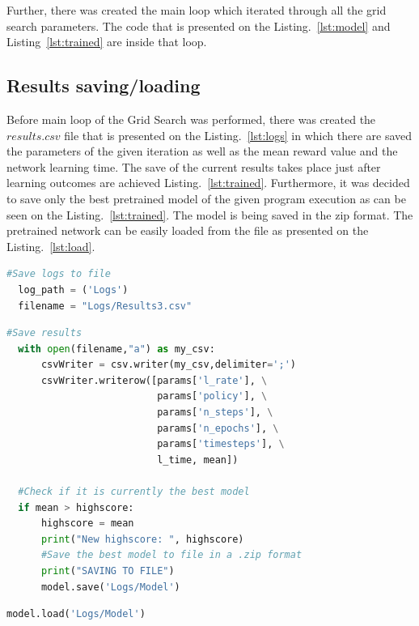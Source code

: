 \documentclass[runningheads]{llncs}
\begin{document}
Further, there was created the main loop which iterated through all the grid search parameters. The code that is presented on the Listing.~\ref{lst:model} and Listing~\ref{lst:trained} are inside that loop.

\subsection{Results saving/loading}
Before main loop of the Grid Search was performed, there was created the $results.csv$ file that is presented on the Listing.~\ref{lst:logs} in which there are saved the parameters of the given iteration as well as the mean reward value and the network learning time. The save of the current results takes place just after learning outcomes are achieved Listing.~\ref{lst:trained}. Furthermore, it was decided to save only the best pretrained model of the given program execution as can be seen on the Listing.~\ref{lst:trained}. The model is being saved in the zip format. The pretrained network can be easily loaded from the file as presented on the Listing.~\ref{lst:load}.

\begin{lstlisting}[caption={Log files creation}, language=Python, label={lst:logs}]
  #Save logs to file
  log_path = ('Logs')
  filename = "Logs/Results3.csv"
\end{lstlisting}

\begin{lstlisting}[caption={Pretrained model and parameters saving}, language=Python, label={lst:trained}]
  #Save results
  with open(filename,"a") as my_csv:
      csvWriter = csv.writer(my_csv,delimiter=';')
      csvWriter.writerow([params['l_rate'], \
                          params['policy'], \
                          params['n_steps'], \
                          params['n_epochs'], \
                          params['timesteps'], \
                          l_time, mean])
  
  #Check if it is currently the best model
  if mean > highscore:
      highscore = mean
      print("New highscore: ", highscore)
      #Save the best model to file in a .zip format
      print("SAVING TO FILE")
      model.save('Logs/Model')
\end{lstlisting}

\begin{lstlisting}[caption={Loading pretrained network}, language=Python, label={lst:load}]
  model.load('Logs/Model')
\end{lstlisting}
\end{document}
